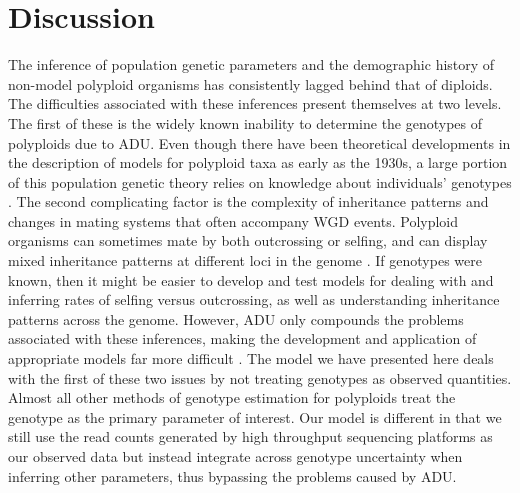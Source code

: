 \documentclass[11pt,english,letterpaper,oneside]{article}
\begin{document}
\section*{Discussion}         %

The inference of population genetic parameters and the demographic history of non-model polyploid organisms has consistently lagged behind that of diploids. The difficulties associated with these inferences present themselves at two levels. The first of these is the widely known inability to determine the genotypes of polyploids due to ADU. Even though there have been theoretical developments in the description of models for polyploid taxa as early as the 1930s, a large portion of this population genetic theory relies on knowledge about individuals' genotypes \citep[e.g.,][]{haldane1930autopolyploids,wright1938polyploid}. The second complicating factor is the complexity of inheritance patterns and changes in mating systems that often accompany WGD events. Polyploid organisms can sometimes mate by both outcrossing or selfing, and can display mixed inheritance patterns at different loci in the genome \citep{dufresne2014polyPopGen}. If genotypes were known, then it might be easier to develop and test models for dealing with and inferring rates of selfing versus outcrossing, as well as understanding inheritance patterns across the genome. However, ADU only compounds the problems associated with these inferences, making the development and application of appropriate models far more difficult \citep[but see list of software in][]{dufresne2014polyPopGen}. The model we have presented here deals with the first of these two issues by not treating genotypes as observed quantities. Almost all other methods of genotype estimation for polyploids treat the genotype as the primary parameter of interest. Our model is different in that we still use the read counts generated by high throughput sequencing platforms as our observed data but instead integrate across genotype uncertainty when inferring other parameters, thus bypassing the problems caused by ADU.
\medskip
\end{document}
